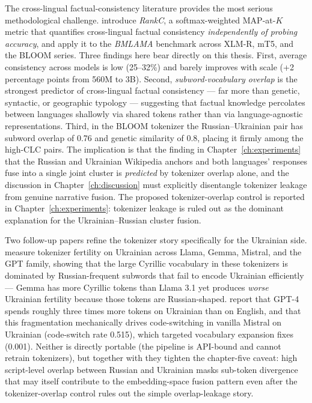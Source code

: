 The cross-lingual factual-consistency literature provides the most
serious methodological challenge. \citet{qi2023crosslingual} introduce
\emph{RankC}, a softmax-weighted MAP-at-$K$ metric that quantifies
cross-lingual factual consistency \emph{independently of probing
accuracy}, and apply it to the \emph{BMLAMA} benchmark across XLM-R,
mT5, and the BLOOM series. Three findings here bear directly on this
thesis. First, average consistency across models is low (25--32\%) and
barely improves with scale (+2 percentage points from 560M to 3B).
Second, \emph{subword-vocabulary overlap} is the strongest predictor of
cross-lingual factual consistency --- far more than genetic, syntactic,
or geographic typology --- suggesting that factual knowledge percolates
between languages shallowly via shared tokens rather than via
language-agnostic representations. Third, in the BLOOM tokenizer the
Russian--Ukrainian pair has subword overlap of 0.76 and genetic
similarity of 0.8, placing it firmly among the high-CLC pairs. The
implication is that the finding in Chapter~\ref{ch:experiments} that
the Russian and Ukrainian Wikipedia anchors and both languages'
responses fuse into a single joint cluster is \emph{predicted} by
tokenizer overlap alone, and
the discussion in Chapter~\ref{ch:discussion} must explicitly
disentangle tokenizer leakage from genuine narrative fusion. The
proposed tokenizer-overlap control is reported in
Chapter~\ref{ch:experiments}: tokenizer leakage is ruled out as
the dominant explanation for the Ukrainian--Russian cluster fusion.

Two follow-up papers refine the tokenizer story specifically for the
Ukrainian side. \citet{maksymenko2025tokenization} measure tokenizer
fertility on Ukrainian across Llama, Gemma, Mistral, and the GPT
family, showing that the large Cyrillic vocabulary in these
tokenizers is dominated by Russian-frequent subwords that fail to
encode Ukrainian efficiently --- Gemma has more Cyrillic tokens than
Llama 3.1 yet produces \emph{worse} Ukrainian fertility because those
tokens are Russian-shaped. \citet{kiulian2024bilingual} report that
GPT-4 spends roughly three times more tokens on Ukrainian than on
English, and that this fragmentation mechanically drives
code-switching in vanilla Mistral on Ukrainian (code-switch rate
0.515), which targeted vocabulary expansion fixes (0.001). Neither
is directly portable (the pipeline is API-bound and cannot retrain
tokenizers), but together
with \citet{qi2023crosslingual} they tighten the chapter-five caveat:
high script-level overlap between Russian and Ukrainian masks
sub-token divergence that may itself contribute to the embedding-space
fusion pattern even after the tokenizer-overlap control rules out
the simple overlap-leakage story.

